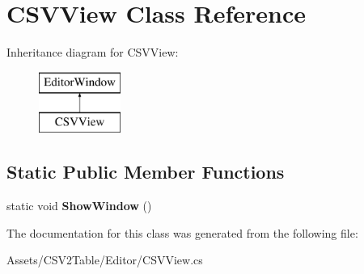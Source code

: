 \hypertarget{class_c_s_v_view}{}\section{C\+S\+V\+View Class Reference}
\label{class_c_s_v_view}
Inheritance diagram for C\+S\+V\+View\+:\begin{figure}[H]
\begin{center}
\leavevmode
\includegraphics[height=2.000000cm]{class_c_s_v_view}
\end{center}
\end{figure}
\subsection*{Static Public Member Functions}
\begin{DoxyCompactItemize}
\item 
static void {\bfseries Show\+Window} ()\hypertarget{class_c_s_v_view_aed14684fe84cc243119b688b05e5d914}{}\label{class_c_s_v_view_aed14684fe84cc243119b688b05e5d914}

\end{DoxyCompactItemize}


The documentation for this class was generated from the following file\+:\begin{DoxyCompactItemize}
\item 
Assets/\+C\+S\+V2\+Table/\+Editor/C\+S\+V\+View.\+cs\end{DoxyCompactItemize}
